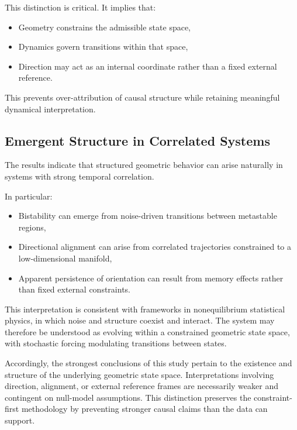 \documentclass[twocolumn,9pt]{revtex4-2}
\begin{document}
This distinction is critical. It implies that:

\begin{itemize}
\item Geometry constrains the admissible state space,
\item Dynamics govern transitions within that space,
\item Direction may act as an internal coordinate rather
than a fixed external reference.
\end{itemize}

This prevents over-attribution of causal structure while
retaining meaningful dynamical interpretation.

\subsection{Emergent Structure in Correlated Systems}
\label{subsec:emergent_structure_in_correlated_systems}

The results indicate that structured geometric behavior can arise naturally in systems with strong temporal correlation.

In particular:

\begin{itemize}
    \item Bistability can emerge from noise-driven transitions between metastable regions,
    \item Directional alignment can arise from correlated trajectories constrained to a low-dimensional manifold,
    \item Apparent persistence of orientation can result from memory effects rather than fixed external constraints.
\end{itemize}

This interpretation is consistent with frameworks in nonequilibrium statistical physics, in which noise and structure coexist and interact. The system may therefore be understood as evolving within a constrained geometric state space, with stochastic forcing modulating transitions between states.

Accordingly, the strongest conclusions of this study pertain to the existence and structure of the underlying geometric state space. Interpretations involving direction, alignment, or external reference frames are necessarily weaker and contingent on null-model assumptions. This distinction preserves the constraint-first methodology by preventing stronger causal claims than the data can support.
\end{document}
